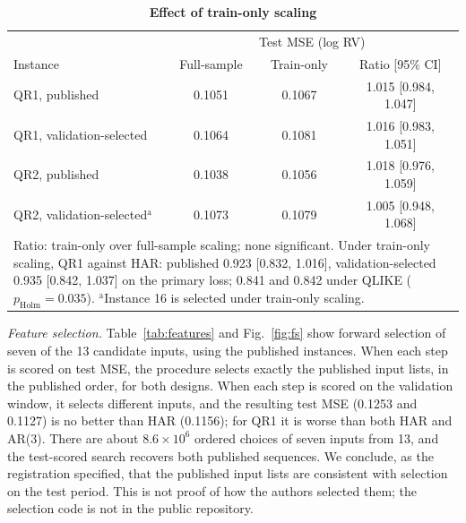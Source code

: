 \documentclass{ieeeaccess}
\begin{document}
\begin{table}[t]
\caption{\textbf{Effect of train-only scaling}}
\label{tab:scaling}
\setlength{\tabcolsep}{3pt}
\begin{tabular}{|l|c|c|c|}
\hline
& \multicolumn{3}{c|}{Test MSE (log RV)}\\
Instance & Full-sample & Train-only & Ratio [95\% CI]\\
\hline
QR1, published & 0.1051 & 0.1067 & 1.015 [0.984, 1.047]\\
QR1, validation-selected & 0.1064 & 0.1081 & 1.016 [0.983, 1.051]\\
QR2, published & 0.1038 & 0.1056 & 1.018 [0.976, 1.059]\\
QR2, validation-selected$^\mathrm{a}$ & 0.1073 & 0.1079 & 1.005 [0.948, 1.068]\\
\hline
\multicolumn{4}{p{240pt}}{Ratio: train-only over full-sample scaling; none significant. Under train-only scaling, QR1 against HAR: published 0.923 [0.832, 1.016], validation-selected 0.935 [0.842, 1.037] on the primary loss; 0.841 and 0.842 under QLIKE ($p_\mathrm{Holm}=0.035$). $^\mathrm{a}$Instance 16 is selected under train-only scaling.}\\
\end{tabular}
\end{table}

\emph{Feature selection.} Table~\ref{tab:features} and Fig.~\ref{fig:fs} show forward selection of seven of the 13 candidate inputs, using the published instances. When each step is scored on test MSE, the procedure selects exactly the published input lists, in the published order, for both designs. When each step is scored on the validation window, it selects different inputs, and the resulting test MSE (0.1253 and 0.1127) is no better than HAR (0.1156); for QR1 it is worse than both HAR and AR(3). There are about $8.6\times10^{6}$ ordered choices of seven inputs from 13, and the test-scored search recovers both published sequences. We conclude, as the registration specified, that the published input lists are consistent with selection on the test period. This is not proof of how the authors selected them; the selection code is not in the public repository.
\end{document}
